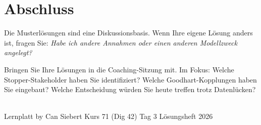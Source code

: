 \documentclass[11pt,a4paper,oneside]{article}
\begin{document}
\clearpage

\section*{Abschluss}
\thispagestyle{plain}

\noindent Die Musterl\"osungen sind eine Diskussionsbasis. Wenn Ihre eigene L\"osung anders ist, fragen Sie: \emph{Habe ich andere Annahmen \textendash{} oder einen anderen Modellzweck angelegt?}

\medskip
\begin{infobox}
Bringen Sie Ihre L\"osungen in die Coaching-Sitzung mit. Im Fokus: Welche Stopper-Stakeholder haben Sie identifiziert? Welche Goodhart-Kopplungen haben Sie eingebaut? Welche Entscheidung w\"urden Sie heute treffen \textendash{} trotz Datenl\"ucken?
\end{infobox}

\vspace{1cm}
\noindent{\color{lpAccent}\rule{\linewidth}{0.6pt}}\\[4pt]
{\footnotesize\sffamily\color{lpGray}Lernplatt \textperiodcentered{} by Can Siebert \textperiodcentered{} Kurs 71 (Dig 42) \textperiodcentered{} Tag 3 \textperiodcentered{} L\"osungsheft \textperiodcentered{} \textcopyright{} 2026}
\end{document}
